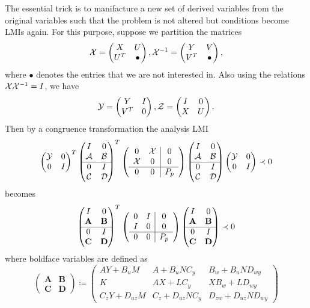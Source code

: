 The essential trick is to manifacture a new set of derived variables from the original variables such that the problem is not altered but 
conditions become LMIs again. For this purpose, suppose we partition the matrices 
\[
\mathcal{X} = \begin{pmatrix}X &U\\U^T &\bullet\end{pmatrix}, \mathcal{X}^{-1} = \begin{pmatrix}Y &V\\V^T &\bullet\end{pmatrix}, 
\]
where $\bullet$ denotes the entries that we are not interested in. Also using the relations $\mathcal{X}\mathcal{X}^{-1}=I$, we have
\[
\mathcal{Y} = \begin{pmatrix}Y&I\\V^T&0\end{pmatrix}, \mathcal{Z} = \begin{pmatrix}I&0\\X&U\end{pmatrix}.
\]
Then by a congruence transformation the analysis LMI
\[
\begin{pmatrix}\mathcal{Y}&0\\0&I\end{pmatrix}^T\begin{pmatrix}I&0\\\mathcal{A}&\mathcal{B}\\\hline 0&I\\\mathcal{C}&\mathcal{D}\end{pmatrix}^T
\left(
\begin{array}{cc|c}
	0&\mathcal{X}&0\\\mathcal{X}&0&0\\\hline 0&0&P_p
\end{array}
\right)
\begin{pmatrix}I&0\\\mathcal{A}&\mathcal{B}\\\hline 0&I\\\mathcal{C}&\mathcal{D}\end{pmatrix}\begin{pmatrix}\mathcal{Y}&0\\0&I\end{pmatrix}\prec 0
\]
becomes
\begin{equation}
\begin{pmatrix}I&0\\\mathbf{A}&\mathbf{B}\\\hline 0&I\\\mathbf{C}&\mathbf{D}\end{pmatrix}^T
\left(
\begin{array}{cc|c}
	0&I&0\\I&0&0\\\hline 0&0&P_p
\end{array}
\right)
\begin{pmatrix}I&0\\\mathbf{A}&\mathbf{B}\\\hline 0&I\\\mathbf{C}&\mathbf{D}\end{pmatrix} \prec 0
\label{eq:synthnom}
\end{equation}
where boldface variables are defined as 
\[
\left(\begin{array}{c|c}
	\mathbf{A} &\mathbf{B}\\\hline\mathbf{C} &\mathbf{D}
\end{array}\right) \coloneqq \left(
\begin{array}{cc|c}
	AY+B_uM          &A+B_uNC_y     &B_w+B_uND_{wy}\\
	K                &AX+LC_y       &XB_w+LD_{wy}\\\hline
	C_zY+D_{uz}M     &C_z+D_{uz}NC_y &D_{zw}+D_{uz}ND_{wy}
\end{array}
\right)
\]
